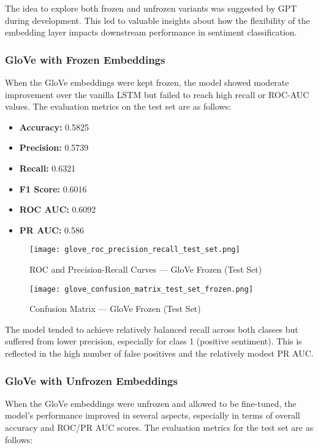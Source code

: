 \documentclass[12pt]{article}
\begin{document}
The idea to explore both frozen and unfrozen variants was suggested by GPT during development. This led to valuable insights about how the flexibility of the embedding layer impacts downstream performance in sentiment classification.

\subsubsection*{GloVe with Frozen Embeddings}

When the GloVe embeddings were kept frozen, the model showed moderate improvement over the vanilla LSTM but failed to reach high recall or ROC-AUC values. The evaluation metrics on the test set are as follows:

\begin{itemize}
    \item \textbf{Accuracy:} 0.5825
    \item \textbf{Precision:} 0.5739
    \item \textbf{Recall:} 0.6321
    \item \textbf{F1 Score:} 0.6016
    \item \textbf{ROC AUC:} 0.6092
    \item \textbf{PR AUC:} 0.586
\end{itemize}

\begin{figure}[H]
    \centering
    \texttt{[image: glove\_roc\_precision\_recall\_test\_set.png]}
    \caption{ROC and Precision-Recall Curves — GloVe Frozen (Test Set)}
\end{figure}

\begin{figure}[H]
    \centering
    \texttt{[image: glove\_confusion\_matrix\_test\_set\_frozen.png]}
    \caption{Confusion Matrix — GloVe Frozen (Test Set)}
\end{figure}

The model tended to achieve relatively balanced recall across both classes but suffered from lower precision, especially for class 1 (positive sentiment). This is reflected in the high number of false positives and the relatively modest PR AUC.

\subsubsection*{GloVe with Unfrozen Embeddings}

When the GloVe embeddings were unfrozen and allowed to be fine-tuned, the model's performance improved in several aspects, especially in terms of overall accuracy and ROC/PR AUC scores. The evaluation metrics for the test set are as follows:
\end{document}
